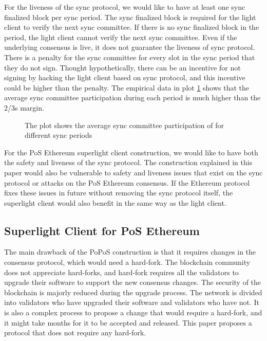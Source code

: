 \documentclass[a4paper,11pt,oneside]{article}
\theoremstyle{definition}
\begin{document}
  For the liveness of the sync protocol, we would like to have at least one sync finalized block per sync period. The sync finalized block is required for the light client to verify the next sync committee. If there is no sync finalized block in the period, the light client cannot verify the next sync committee. Even if the underlying consensus is live, it does not guarantee the liveness of sync protocol. There is a penalty for the sync committee for every slot in the sync period that they do not sign. Thought hypothetically, there can be an incentive for not signing by hacking the light client based on sync protocol, and this incentive could be higher than the penalty. The empirical data in plot \ref{fig:committee-participation} shows that the average sync committee participation during each period is much higher than the 2/3s margin.
  
  \begin{figure}[h!]
    \begin{center}
        
    \end{center}
    \caption{The plot shows the average sync committee participation of for different sync periods}
     \label{fig:committee-participation}
  \end{figure}

   For the PoS Ethereum superlight client construction, we would like to have both the safety and liveness of the sync protocol. The construction explained in this paper would also be vulnerable to safety and liveness issues that exist on the sync protocol or attacks on the PoS Ethereum consensus\cite{DBLP:journals/corr/abs-2110-10086,AttackOnEthereum}. If the Ethereum protocol fixes these issues in future without removing the sync protocol itself, the superlight client would also benefit in the same way as the light client. 
  
  \subsection{Superlight Client for PoS Ethereum}
   The main drawback of the PoPoS construction is that it requires changes in the consensus protocol, which would need a hard-fork. The blockchain community does not appreciate hard-forks, and hard-fork requires all the validators to upgrade their software to support the new consensus changes. The security of the blockchain is majorly reduced during the upgrade process. The network is divided into validators who have upgraded their software and validators who have not. It is also a complex process to propose a change that would require a hard-fork, and it might take months for it to be accepted and released. This paper proposes a protocol that does not require any hard-fork. 
\end{document}

